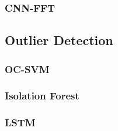\subsubsection{CNN-FFT}

\subsection{Outlier Detection}

\subsubsection{\acs{OC-SVM}}

\subsubsection{Isolation Forest}

\subsubsection{\acs{LSTM}}

